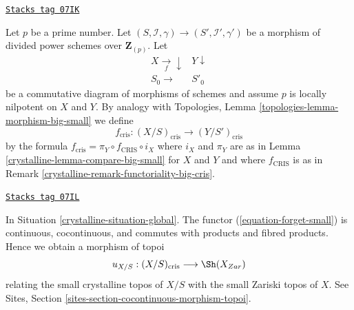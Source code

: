 \begin{remark}[Functoriality]

\label{crystalline-remark-functoriality-cris}
\href{https://stacks.math.columbia.edu/tag/07IK}{\texttt{Stacks tag 07IK}}

Let $p$ be a prime number.
Let $(S, \mathcal{I}, \gamma) \to (S', \mathcal{I}', \gamma')$
be a morphism of divided power schemes over $\mathbf{Z}_{(p)}$.
Let
$$
\begin{array}{cc}X \underset{f}{\longrightarrow}\downarrow & Y \downarrow \\ S_0 \longrightarrow & S'_0\end{array}
$$
be a commutative diagram of morphisms of schemes and assume $p$ is
locally nilpotent on $X$ and $Y$. By analogy with
Topologies, Lemma \ref{topologies-lemma-morphism-big-small} we define
$$
f_{\text{cris}} : (X/S)_{\text{cris}} \longrightarrow (Y/S')_{\text{cris}}
$$
by the formula $f_{\text{cris}} = \pi_Y \circ f_{\text{CRIS}} \circ i_X$
where $i_X$ and $\pi_Y$ are as in Lemma \ref{crystalline-lemma-compare-big-small}
for $X$ and $Y$ and where $f_{\text{CRIS}}$ is as in
Remark \ref{crystalline-remark-functoriality-big-cris}.
\end{remark}

\begin{remark}

\label{crystalline-remark-compare-zariski}
\href{https://stacks.math.columbia.edu/tag/07IL}{\texttt{Stacks tag 07IL}}

In Situation \ref{crystalline-situation-global}.
The functor (\ref{equation-forget-small}) is continuous, cocontinuous, and
commutes with products and fibred products.
Hence we obtain a morphism of topoi
$$
u_{X/S} : (X/S)_{\text{cris}} \longrightarrow \Sh(X_{Zar})
$$
relating the small crystalline topos of $X/S$ with
the small Zariski topos of $X$.
See Sites, Section \ref{sites-section-cocontinuous-morphism-topoi}.
\end{remark}

